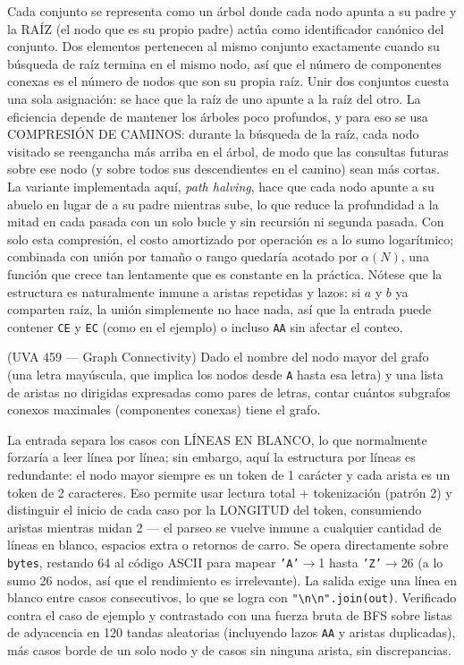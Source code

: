  Cada conjunto se representa como un árbol donde cada nodo apunta a su padre y la RAÍZ (el nodo que es su propio padre) actúa como identificador canónico del conjunto. Dos elementos pertenecen al mismo conjunto exactamente cuando su búsqueda de raíz termina en el mismo nodo, así que el número de componentes conexas es el número de nodos que son su propia raíz. Unir dos conjuntos cuesta una sola asignación: se hace que la raíz de uno apunte a la raíz del otro. La eficiencia depende de mantener los árboles poco profundos, y para eso se usa COMPRESIÓN DE CAMINOS: durante la búsqueda de la raíz, cada nodo visitado se reengancha más arriba en el árbol, de modo que las consultas futuras sobre ese nodo (y sobre todos sus descendientes en el camino) sean más cortas. La variante implementada aquí, \emph{path halving}, hace que cada nodo apunte a su abuelo en lugar de a su padre mientras sube, lo que reduce la profundidad a la mitad en cada pasada con un solo bucle y sin recursión ni segunda pasada. Con solo esta compresión, el costo amortizado por operación es a lo sumo logarítmico; combinada con unión por tamaño o rango quedaría acotado por $\alpha(N)$, una función que crece tan lentamente que es constante en la práctica. Nótese que la estructura es naturalmente inmune a aristas repetidas y lazos: si $a$ y $b$ ya comparten raíz, la unión simplemente no hace nada, así que la entrada puede contener \texttt{CE} y \texttt{EC} (como en el ejemplo) o incluso \texttt{AA} sin afectar el conteo.


(UVA 459 — Graph Connectivity) Dado el nombre del nodo mayor del grafo (una letra mayúscula, que implica los nodos desde \texttt{A} hasta esa letra) y una lista de aristas no dirigidas expresadas como pares de letras, contar cuántos subgrafos conexos maximales (componentes conexas) tiene el grafo.

 La entrada separa los casos con LÍNEAS EN BLANCO, lo que normalmente forzaría a leer línea por línea; sin embargo, aquí la estructura por líneas es redundante: el nodo mayor siempre es un token de 1 carácter y cada arista es un token de 2 caracteres. Eso permite usar lectura total + tokenización (patrón 2) y distinguir el inicio de cada caso por la LONGITUD del token, consumiendo aristas mientras midan 2 — el parseo se vuelve inmune a cualquier cantidad de líneas en blanco, espacios extra o retornos de carro. Se opera directamente sobre \texttt{bytes}, restando 64 al código ASCII para mapear \texttt{'A'}$\to$1 hasta \texttt{'Z'}$\to$26 (a lo sumo 26 nodos, así que el rendimiento es irrelevante). La salida exige una línea en blanco entre casos consecutivos, lo que se logra con \texttt{"\textbackslash n\textbackslash n".join(out)}. Verificado contra el caso de ejemplo y contrastado con una fuerza bruta de BFS sobre listas de adyacencia en 120 tandas aleatorias (incluyendo lazos \texttt{AA} y aristas duplicadas), más casos borde de un solo nodo y de casos sin ninguna arista, sin discrepancias.

